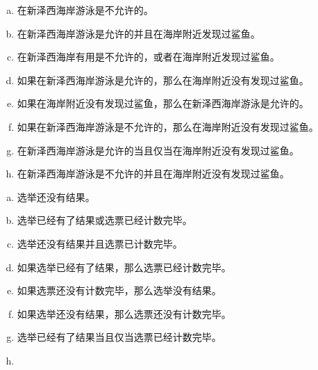 {{        \begin{practices}
            \begin{enumerate}[a)]
                \item 在新泽西海岸游泳是不允许的。
                \item 在新泽西海岸游泳是允许的并且在海岸附近发现过鲨鱼。
                \item 在新泽西海岸有用是不允许的，或者在海岸附近发现过鲨鱼。
                \item 如果在新泽西海岸游泳是允许的，那么在海岸附近没有发现过鲨鱼。
                \item 如果在海岸附近没有发现过鲨鱼，那么在新泽西海岸游泳是允许的。
                \item 如果在新泽西海岸游泳是不允许的，那么在海岸附近没有发现过鲨鱼。
                \item 在新泽西海岸游泳是允许的当且仅当在海岸附近没有发现过鲨鱼。
                \item 在新泽西海岸游泳是不允许的并且在海岸附近没有发现过鲨鱼。
            \end{enumerate}
        \end{practices}

        \begin{practices}
            \begin{enumerate}[a)]
                \item 选举还没有结果。
                \item 选举已经有了结果或选票已经计数完毕。
                \item 选举还没有结果并且选票已计数完毕。
                \item 如果选举已经有了结果，那么选票已经计数完毕。
                \item 如果选票还没有计数完毕，那么选举没有结果。
                \item 如果选举还没有结果，那么选票还没有计数完毕。
                \item 选举已经有了结果当且仅当选票已经计数完毕。
                \item 
            \end{enumerate}
        \end{practices}
    }
}
